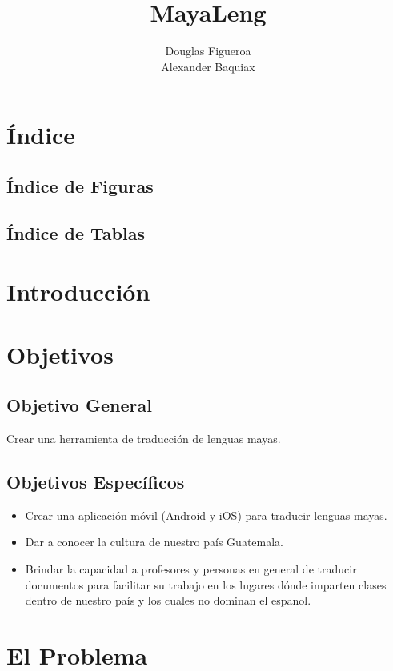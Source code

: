 \documentclass[a4paper,openright,12pt]{article}
\title{\LARGE MayaLeng{}}
\author{\normalsize Douglas Figueroa \\ \normalsize Alexander Baquiax}
\date{}
\begin{document}
\maketitle
\renewcommand{\tablename}{Tabla}
\renewcommand{\listtablename}{\I'ndice de tablas}

\section{\'Indice}
\subsection{\'Indice de Figuras}
\subsection{\'Indice de Tablas}

\newpage

\section{Introducci\'on}
\newpage

\section{Objetivos}
\subsection{Objetivo General}
Crear una herramienta de traducci\'on de lenguas mayas.
\subsection{Objetivos Espec\'ificos}
\begin{itemize}
    \item Crear una aplicaci\'on m\'ovil (Android y iOS) para traducir lenguas mayas.
    \item Dar a conocer la cultura de nuestro pa\'is Guatemala.
    \item Brindar la capacidad a profesores y personas en general de traducir documentos para facilitar su trabajo en los lugares d\'onde imparten clases dentro de nuestro pa\'is y los cuales no dominan el espanol.
\end{itemize}
\newpage

\section{El Problema}
\end{document}
